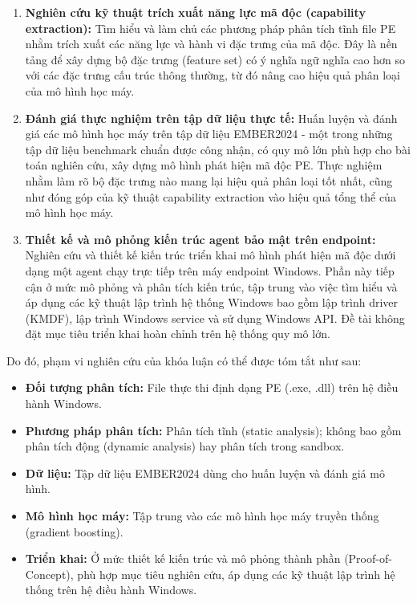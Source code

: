 \begin{enumerate}
    \item \textbf{Nghiên cứu kỹ thuật trích xuất năng lực mã độc (capability extraction):}
    Tìm hiểu và làm chủ các phương pháp phân tích tĩnh file PE nhằm trích xuất
    các năng lực và hành vi đặc trưng của mã độc. Đây là nền tảng để xây dựng
    bộ đặc trưng (feature set) có ý nghĩa ngữ nghĩa cao hơn so với các đặc
    trưng cấu trúc thông thường, từ đó nâng cao hiệu quả phân loại của mô
    hình học máy.
    \item \textbf{Đánh giá thực nghiệm trên tập dữ liệu thực tế:}
    Huấn luyện và đánh giá các mô hình học máy trên tập dữ liệu EMBER2024 - một
    trong những tập dữ liệu benchmark chuẩn được công nhận, có quy mô lớn phù hợp
    cho bài toán nghiên cứu, xây dựng mô hình phát hiện mã độc PE.
    Thực nghiệm nhằm làm rõ bộ đặc trưng nào mang lại hiệu quả phân
    loại tốt nhất, cũng như đóng góp của kỹ thuật capability extraction
    vào hiệu quả tổng thể của mô hình học máy.
    \item \textbf{Thiết kế và mô phỏng kiến trúc agent bảo mật trên endpoint:}
    Nghiên cứu và thiết kế kiến trúc triển khai mô hình phát hiện mã độc dưới
    dạng một agent chạy trực tiếp trên máy endpoint Windows. Phần này tiếp cận
    ở mức mô phỏng và phân tích kiến trúc, tập trung vào việc tìm hiểu và áp
    dụng các kỹ thuật lập trình hệ thống Windows bao gồm lập trình driver (KMDF),
    lập trình Windows service và sử dụng Windows API. Đề tài không đặt mục tiêu
    triển khai hoàn chỉnh trên hệ thống quy mô lớn.
\end{enumerate}

Do đó, phạm vi nghiên cứu của khóa luận có thể được tóm tắt như sau:

\begin{itemize}
    \item \textbf{Đối tượng phân tích:} File thực thi định dạng PE (.exe, .dll)
    trên hệ điều hành Windows.
    \item \textbf{Phương pháp phân tích:} Phân tích tĩnh (static analysis);
    không bao gồm phân tích động (dynamic analysis) hay phân tích trong sandbox.
    \item \textbf{Dữ liệu:} Tập dữ liệu EMBER2024 dùng cho huấn luyện và đánh giá mô hình.
    \item \textbf{Mô hình học máy:} Tập trung vào các mô hình học máy truyền thống
    (gradient boosting).
    \item \textbf{Triển khai:} Ở mức thiết kế kiến trúc và mô phỏng thành phần
    (Proof-of-Concept), phù hợp mục tiêu nghiên cứu, áp dụng các kỹ thuật lập
    trình hệ thống trên hệ điều hành Windows.
\end{itemize}







